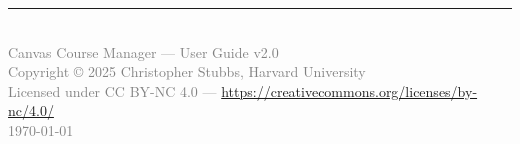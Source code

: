 \documentclass[12pt,letterpaper]{article}
\begin{document}
\vfill
\begin{center}
\textcolor{gray}{\rule{0.5\textwidth}{0.5pt}}\\[0.5em]
\textcolor{gray}{\small Canvas Course Manager --- User Guide v2.0}\\
\textcolor{gray}{\small Copyright \copyright{} 2025 Christopher Stubbs, Harvard University}\\
\textcolor{gray}{\small Licensed under CC BY-NC 4.0 --- \url{https://creativecommons.org/licenses/by-nc/4.0/}}\\
\textcolor{gray}{\small\today}
\end{center}
\end{document}

